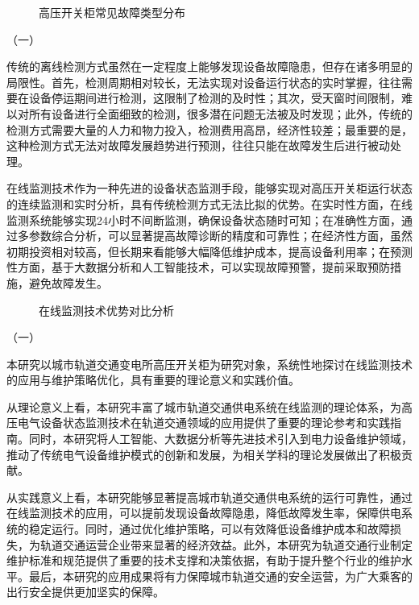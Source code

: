 \begin{figure}[h]
\centering
\caption{高压开关柜常见故障类型分布}
\label{fig:switchgear_fault_types}
\end{figure}

（一）

传统的离线检测方式虽然在一定程度上能够发现设备故障隐患，但存在诸多明显的局限性。首先，检测周期相对较长，无法实现对设备运行状态的实时掌握，往往需要在设备停运期间进行检测，这限制了检测的及时性；其次，受天窗时间限制，难以对所有设备进行全面细致的检测，很多潜在问题无法被及时发现；此外，传统的检测方式需要大量的人力和物力投入，检测费用高昂，经济性较差；最重要的是，这种检测方式无法对故障发展趋势进行预测，往往只能在故障发生后进行被动处理。

在线监测技术作为一种先进的设备状态监测手段，能够实现对高压开关柜运行状态的连续监测和实时分析，具有传统检测方式无法比拟的优势。在实时性方面，在线监测系统能够实现24小时不间断监测，确保设备状态随时可知；在准确性方面，通过多参数综合分析，可以显著提高故障诊断的精度和可靠性；在经济性方面，虽然初期投资相对较高，但长期来看能够大幅降低维护成本，提高设备利用率；在预测性方面，基于大数据分析和人工智能技术，可以实现故障预警，提前采取预防措施，避免故障发生。

\begin{figure}[h]
\centering
\caption{在线监测技术优势对比分析}
\label{fig:monitoring_advantage}
\end{figure}

（一）

本研究以城市轨道交通变电所高压开关柜为研究对象，系统性地探讨在线监测技术的应用与维护策略优化，具有重要的理论意义和实践价值。

从理论意义上看，本研究丰富了城市轨道交通供电系统在线监测的理论体系，为高压电气设备状态监测技术在轨道交通领域的应用提供了重要的理论参考和实践指南。同时，本研究将人工智能、大数据分析等先进技术引入到电力设备维护领域，推动了传统电气设备维护模式的创新和发展，为相关学科的理论发展做出了积极贡献。

从实践意义上看，本研究能够显著提高城市轨道交通供电系统的运行可靠性，通过在线监测技术的应用，可以提前发现设备故障隐患，降低故障发生率，保障供电系统的稳定运行。同时，通过优化维护策略，可以有效降低设备维护成本和故障损失，为轨道交通运营企业带来显著的经济效益。此外，本研究为轨道交通行业制定维护标准和规范提供了重要的技术支撑和决策依据，有助于提升整个行业的维护水平。最后，本研究的应用成果将有力保障城市轨道交通的安全运营，为广大乘客的出行安全提供更加坚实的保障。

